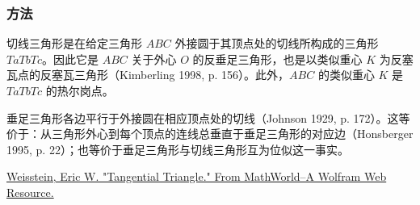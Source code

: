 \begin{tkzexample}[latex=6cm]
\begin{center}
\end{center}

\end{tkzexample}

\subsubsection{方法 } %
\label{ssub:method_triangle_tangential}

切线三角形是在给定三角形 $ABC$ 外接圆于其顶点处的切线所构成的三角形 $TaTbTc$。因此它是 $ABC$ 关于外心 $O$ 的反垂足三角形，也是以类似重心 $K$ 为反塞瓦点的反塞瓦三角形（Kimberling 1998, p. 156）。此外，$ABC$ 的类似重心 $K$ 是 $TaTbTc$ 的热尔岗点。

垂足三角形各边平行于外接圆在相应顶点处的切线（Johnson 1929, p. 172）。这等价于：从三角形外心到每个顶点的连线总垂直于垂足三角形的对应边（Honsberger 1995, p. 22）；也等价于垂足三角形与切线三角形互为位似这一事实。\begin{flushright}
  \small
\href{[URL1]}{Weisstein, Eric W. "Tangential Triangle." From MathWorld--A Wolfram Web Resource.}
\end{flushright}


